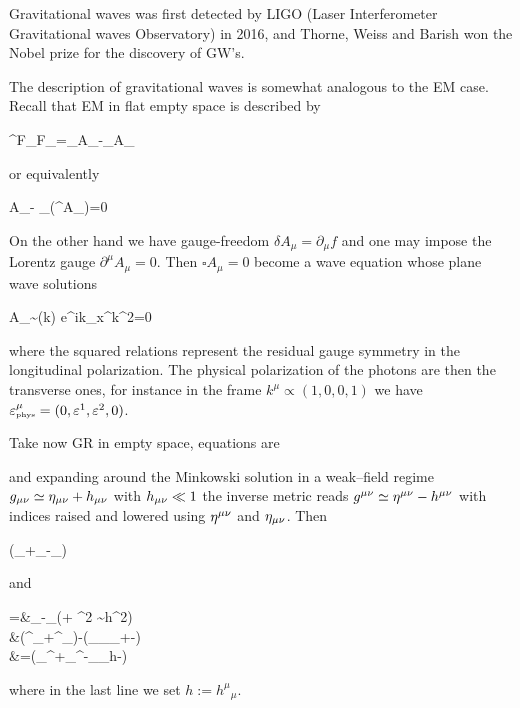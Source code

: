 \documentclass[../main/main.tex]{subfiles}
\begin{document}
Gravitational waves was first detected by LIGO (Laser Interferometer Gravitational waves Observatory) in 2016, and Thorne, Weiss and Barish won the Nobel prize for the discovery of GW's. 

\skipline

The description of gravitational waves is somewhat analogous to the EM case. Recall that EM in flat empty space is described by
\begin{eqalign}
	\partial^\mu F_{\mu\nu}\quad{}\quad F_{\mu\nu}=\partial_\mu A_\nu-\partial_\nu A_\mu
\end{eqalign}
or equivalently
\begin{eqalign}
	\square A_\mu - \partial_\mu(\partial^\nu A_\nu)=0
\end{eqalign}
On the other hand we have gauge-freedom $\delta A_\mu = \partial_\mu f$ and one may impose the Lorentz gauge $\partial^\mu A_\mu=0$. Then $\square A_\mu=0$ become a wave equation whose plane wave solutions
\begin{eqalign}
	A_\mu \sim \ipol\mu(k) e^{ik_\mu x^\mu}\quad{}\quad k^2=0\comma {}
\end{eqalign}
where the squared relations represent the residual gauge symmetry in the longitudinal polarization. 
The physical polarization of the photons are then the transverse ones, for instance in the frame $k^\mu\propto(1,0,0,1)$ we have $\ppol \mu = (0,\pol1, \pol2, 0)$. 

\skipline

Take now GR in empty space, equations are
\begin{eqalign}
	\eten\mu{} \iff \ricc\mu{}
\end{eqalign}
and expanding around the Minkowski solution in a weak--field regime $g_{\mu \nu}\simeq\eta_{\mu \nu}+h_{\mu \nu}$ with $h_{\mu \nu}\ll1$ the inverse metric reads $g^{\mu \nu}\simeq\eta^{\mu \nu}-h^{\mu \nu}$ with indices raised and lowered using $\eta^{\mu \nu}$ and $\eta_{\mu \nu}$.  Then
\begin{eqalign}
	\chris\mu\nu\rho\simeq\half\minkim\mu\sigma(\partial_\nu\wfa\sigma\rho+\partial_\rho\wfa\sigma\nu-\partial_\sigma\wfa\nu\rho)
\end{eqalign}
and
\begin{eqalign}
	\ricc\nu\rho=\curv\mu\nu\mu\rho &\simeq \partial_\mu\chris\mu\nu\rho-\partial_\rho\chris\mu\nu\mu\quad(+ \Gamma^2 \sim h^2)\\
	&\simeq\half(\partial^\sigma\partial_\nu\wfa\sigma\rho+\partial^\sigma\partial_\rho\wfa\mu\rho)-\half(\partial_\rho\partial__\mu+\cancel{\partial_\rho\partial^\mu\wfa\mu\nu}-\cancel{\partial_\rho\partial^\mu\wfa\mu\nu})\\
	&=\half(\partial_\nu\partial^\sigma\wfa\sigma\rho+\partial_\rho\partial^\sigma\wfa\sigma\nu-\partial_\nu\partial_\rho h-\square\wfa\mu\nu)
\end{eqalign}
where in the last line we set $h := {h^\mu}_\mu$. 
	
	
\end{document}
